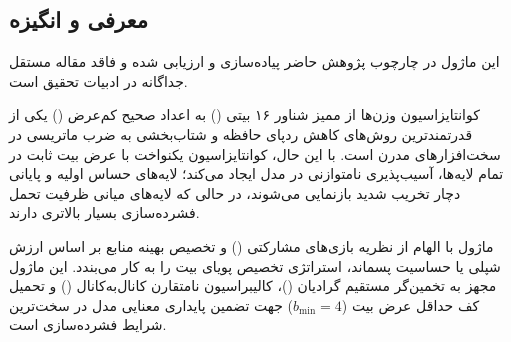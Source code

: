 \subsection{معرفی و انگیزه}
این ماژول در چارچوب پژوهش حاضر پیاده‌سازی و ارزیابی شده و فاقد مقاله مستقل جداگانه در ادبیات تحقیق است.

کوانتایزاسیون وزن‌ها از ممیز شناور ۱۶ بیتی () به اعداد صحیح کم‌عرض () یکی از قدرتمندترین روش‌های کاهش ردپای حافظه و شتاب‌بخشی به ضرب ماتریسی در سخت‌افزارهای مدرن است. با این حال، کوانتایزاسیون یکنواخت با عرض بیت ثابت در تمام لایه‌ها، آسیب‌پذیری نامتوازنی در مدل ایجاد می‌کند؛ لایه‌های حساس اولیه و پایانی دچار تخریب شدید بازنمایی می‌شوند، در حالی که لایه‌های میانی ظرفیت تحمل فشرده‌سازی بسیار بالاتری دارند.

ماژول  با الهام از نظریه بازی‌های مشارکتی () و تخصیص بهینه منابع بر اساس ارزش شپلی یا حساسیت پسماند، استراتژی تخصیص پویای بیت را به کار می‌بندد. این ماژول مجهز به تخمین‌گر مستقیم گرادیان ()، کالیبراسیون نامتقارن کانال‌به‌کانال () و تحمیل کف حداقل عرض بیت ($b_{\min} = 4$) جهت تضمین پایداری معنایی مدل در سخت‌ترین شرایط فشرده‌سازی است.
